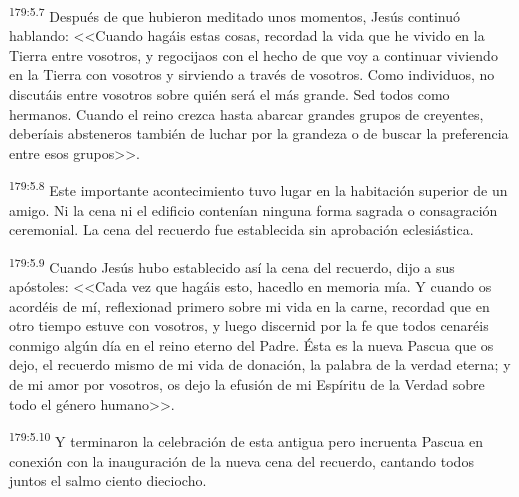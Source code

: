 \par 
\textsuperscript{179:5.7} Después de que hubieron meditado unos momentos, Jesús continuó hablando: <<Cuando hagáis estas cosas, recordad la vida que he vivido en la Tierra entre vosotros, y regocijaos con el hecho de que voy a continuar viviendo en la Tierra con vosotros y sirviendo a través de vosotros. Como individuos, no discutáis entre vosotros sobre quién será el más grande. Sed todos como hermanos. Cuando el reino crezca hasta abarcar grandes grupos de creyentes, deberíais absteneros también de luchar por la grandeza o de buscar la preferencia entre esos grupos>>.

\par 
\textsuperscript{179:5.8} Este importante acontecimiento tuvo lugar en la habitación superior de un amigo. Ni la cena ni el edificio contenían ninguna forma sagrada o consagración ceremonial. La cena del recuerdo fue establecida sin aprobación eclesiástica.

\par 
\textsuperscript{179:5.9} Cuando Jesús hubo establecido así la cena del recuerdo, dijo a sus apóstoles: <<Cada vez que hagáis esto, hacedlo en memoria mía. Y cuando os acordéis de mí, reflexionad primero sobre mi vida en la carne, recordad que en otro tiempo estuve con vosotros, y luego discernid por la fe que todos cenaréis conmigo algún día en el reino eterno del Padre. Ésta es la nueva Pascua que os dejo, el recuerdo mismo de mi vida de donación, la palabra de la verdad eterna; y de mi amor por vosotros, os dejo la efusión de mi Espíritu de la Verdad sobre todo el género humano>>.

\par 
\textsuperscript{179:5.10} Y terminaron la celebración de esta antigua pero incruenta Pascua en conexión con la inauguración de la nueva cena del recuerdo, cantando todos juntos el salmo ciento dieciocho.